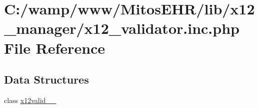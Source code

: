 \hypertarget{x12__validator_8inc_8php}{\section{\-C\-:/wamp/www/\-Mitos\-E\-H\-R/lib/x12\-\_\-manager/x12\-\_\-validator.inc.\-php \-File \-Reference}
\label{x12__validator_8inc_8php}
}
\subsection*{\-Data \-Structures}
\begin{DoxyCompactItemize}
\item 
class \hyperlink{classx12valid__837__4010}{x12valid\-\_\-\_}
\end{DoxyCompactItemize}
